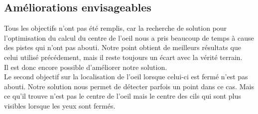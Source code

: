 \newpage

\subsection{Améliorations envisageables}
Tous les objectifs n'ont pas été remplis, car la recherche de solution pour l'optimisation du calcul du centre de l'oeil
nous a pris beaucoup de temps à cause des pistes qui n'ont pas abouti. Notre point obtient de meilleurs résultats
que celui utilisé précédement, mais il reste toujours un écart avec la vérité terrain. \\Il est donc encore possible
d'améliorer notre solution.\\

Le second objectif sur la localisation de l'oeil lorsque celui-ci est fermé n'est pas abouti. Notre solution
nous permet de détecter parfois un point dans ce cas. Mais ce qu'il trouve n'est pas le centre de l'oeil mais le
centre des cils qui sont plus visibles lorsque les yeux sont fermés.